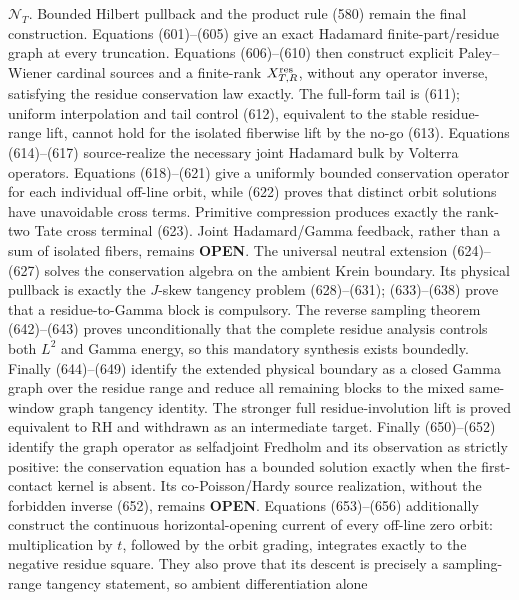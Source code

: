 \documentclass[11pt]{article}
\newcommand{\OPEN}{\textcolor{red!70!black}{\textbf{OPEN}}}
\begin{document}
\begin{itemize}
      \(\mathcal N_T\).  Bounded Hilbert pullback and the product rule (580)
      remain the final construction.  Equations (601)--(605) give an exact
      Hadamard finite-part/residue graph at every truncation.  Equations
      (606)--(610) then construct explicit Paley--Wiener cardinal sources
      and a finite-rank \(X_{T,R}^{\rm res}\), without any operator inverse,
      satisfying the residue conservation law exactly.  The full-form tail
      is (611); uniform interpolation and tail control (612), equivalent to
      the stable residue-range lift, cannot hold for the isolated fiberwise
      lift by the no-go (613).  Equations (614)--(617) source-realize the
      necessary joint Hadamard bulk by Volterra operators.  Equations
      (618)--(621) give a uniformly bounded conservation operator for each
      individual off-line orbit, while (622) proves that distinct orbit
      solutions have unavoidable cross terms.  Primitive compression
      produces exactly the rank-two Tate cross terminal (623).  Joint
      Hadamard/Gamma feedback, rather than a sum of isolated fibers, remains
      \OPEN{}.  The universal neutral extension (624)--(627) solves the
      conservation algebra on the ambient Krein boundary.  Its physical
      pullback is exactly the \(J\)-skew tangency problem (628)--(631);
      (633)--(638) prove that a residue-to-Gamma block is compulsory.
      The reverse sampling theorem (642)--(643) proves unconditionally that
      the complete residue analysis controls both \(L^2\) and Gamma energy,
      so this mandatory synthesis exists boundedly.  Finally
      (644)--(649) identify the extended physical boundary as a closed
      Gamma graph over the residue range and reduce all remaining blocks to
      the mixed same-window graph tangency identity.  The stronger full
      residue-involution lift is proved equivalent to RH and withdrawn as
      an intermediate target.  Finally (650)--(652) identify the graph
      operator as selfadjoint Fredholm and its observation as strictly
      positive: the conservation equation has a bounded solution exactly
      when the first-contact kernel is absent.  Its co-Poisson/Hardy source
      realization, without the forbidden inverse (652), remains \OPEN{}.
      Equations (653)--(656) additionally construct the continuous
      horizontal-opening current of every off-line zero orbit: multiplication
      by \(t\), followed by the orbit grading, integrates exactly to the
      negative residue square.  They also prove that its descent is precisely
      a sampling-range tangency statement, so ambient differentiation alone

\end{itemize}
\end{document}
